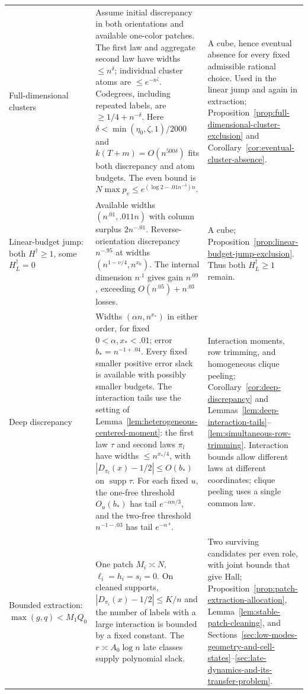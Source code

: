 \begin{longtable}{@{}>{\raggedright\arraybackslash}p{.255\linewidth}>{\raggedright\arraybackslash}p{.355\linewidth}>{\raggedright\arraybackslash}p{.345\linewidth}@{}}
Full-dimensional clusters &
Assume initial discrepancy in both orientations and available one-color
patches. The first law and aggregate second law have widths
$\le n^\delta$; individual cluster atoms are $\le e^{-n^\zeta}$.
Codegrees, including repeated labels, are $\ge1/4+n^{-\delta}$.
Here $\delta<\min(\eta_0,\zeta,1)/2000$ and
$k(T+m)=O(n^{500\delta})$ fits both discrepancy and atom budgets.
The even bound is $N\max p_v\le e^{(\log2-.01n^{-\delta})n}$. &
A cube, hence eventual absence for every fixed admissible rational
choice. Used in the linear jump and again in extraction;
Proposition~\ref{prop:full-dimensional-cluster-exclusion} and
Corollary~\ref{cor:eventual-cluster-absence}.\\

Linear-budget jump: both $H^\dagger\ge1$, some $H_L^\dagger=0$ &
Available widths $(n^{.01},.011n)$ with column surplus $2n^{-.01}$.
Reverse-orientation discrepancy $n^{-.95}$ at widths
$(n^{1-\upsilon/4},n^{x_0})$.
The internal dimension $n^{.1}$ gives gain $n^{.09}$, exceeding
$O(n^{.05})+n^{.03}$ losses. &
A cube; Proposition~\ref{prop:linear-budget-jump-exclusion}.
Thus both $H_L^\dagger\ge1$ remain.\\

Deep discrepancy &
Widths $(\alpha n,n^{x_*})$ in either order, for fixed
$0<\alpha,x_*<.01$; error $b_*=n^{-1+.04}$.
Every fixed smaller positive error slack is available with possibly
smaller budgets. The interaction tails use the setting of
Lemma~\ref{lem:heterogeneous-centered-moment}: the first law $\tau$
and second laws $\pi_l$ have widths $\le n^{x_*/4}$, with
$|D_{\pi_l}(x)-1/2|\le O(b_*)$ on $\operatorname{supp}\tau$.
For each fixed $u$, the one-free threshold $O_u(b_*)$ has tail
$e^{-\alpha n/3}$, and the two-free threshold $n^{-1-.03}$ has tail
$e^{-n^{.4}}$. &
Interaction moments, row trimming, and homogeneous clique peeling;
Corollary~\ref{cor:deep-discrepancy} and
Lemmas~\ref{lem:deep-interaction-tails}--\ref{lem:simultaneous-row-trimming}.
Interaction bounds allow different laws at different coordinates;
clique peeling uses a single common law.\\

Bounded extraction: $\max(g,q)<M_1Q_0$ &
One patch $M_i\asymp N$, $\ell_i=h_i=s_i=0$.
On cleaned supports, $|D_{\pi_i}(x)-1/2|\le K/n$ and the number
of labels with a large interaction is bounded by a fixed constant.
The $r\asymp A_0\log n$ late classes supply polynomial slack. &
Two surviving candidates per even role, with joint bounds that give Hall;
Proposition~\ref{prop:patch-extraction-allocation},
Lemma~\ref{lem:stable-patch-cleaning}, and
Sections~\ref{sec:low-modes-geometry-and-cell-states}--\ref{sec:late-dynamics-and-its-transfer-problem}.\\


\end{longtable}
